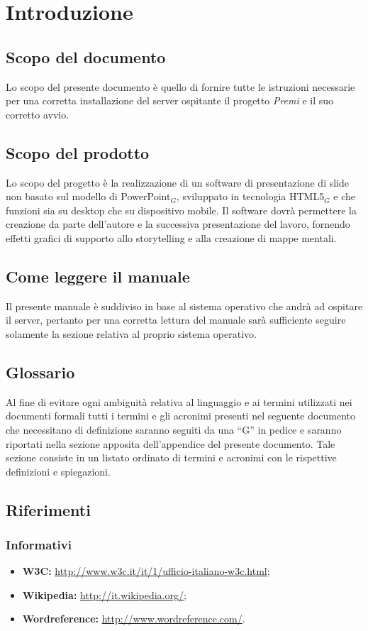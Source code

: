 \section{Introduzione}
\subsection{Scopo del documento}
Lo scopo del presente documento è quello di fornire tutte le istruzioni necessarie per una corretta installazione del server ospitante il progetto \emph{Premi} e il suo corretto avvio.

\subsection{Scopo del prodotto}
Lo scopo del progetto è la realizzazione di un software di presentazione di slide non basato sul modello di PowerPoint$_{G}$, sviluppato in tecnologia HTML5$_{G}$ e che funzioni sia su desktop che su dispositivo mobile. Il software dovrà permettere la creazione da parte dell'autore e la successiva presentazione del lavoro, fornendo effetti grafici di supporto allo storytelling e alla creazione di mappe mentali.

\subsection{Come leggere il manuale}
Il presente manuale è suddiviso in base al sistema operativo che andrà ad ospitare il server, pertanto per una corretta lettura del manuale sarà sufficiente seguire solamente la sezione relativa al proprio sistema operativo.

\subsection{Glossario}
Al fine di evitare ogni ambiguità relativa al linguaggio e ai termini utilizzati nei documenti formali tutti i termini e gli acronimi presenti nel seguente documento che necessitano di definizione saranno seguiti da una ``G'' in pedice e saranno riportati nella sezione apposita dell'appendice del presente documento. Tale sezione consiste in un listato ordinato di termini e acronimi con le rispettive definizioni e spiegazioni.

\subsection{Riferimenti}
\subsubsection{Informativi}
\begin{itemize}
	\item \textbf{W3C:} \href{http://www.w3c.it/it/1/ufficio-italiano-w3c.html}{http://www.w3c.it/it/1/ufficio-italiano-w3c.html};
	\item \textbf{Wikipedia:} \href{http://it.wikipedia.org/}{http://it.wikipedia.org/}; 
	\item \textbf{Wordreference:} \href{http://www.wordreference.com/}{http://www.wordreference.com/}.
\end{itemize}

\newpage